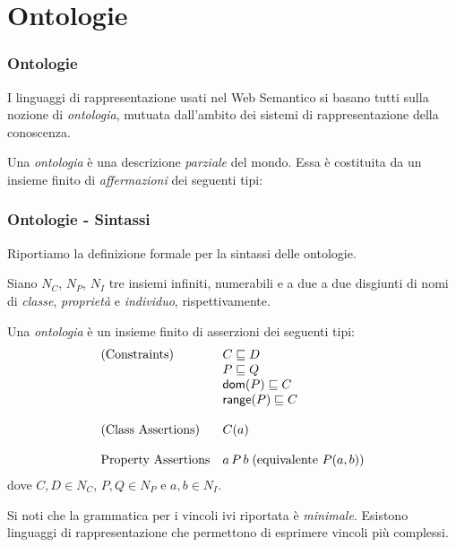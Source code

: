 \documentclass[8pt]{beamer}
\newcommand{\CNames}{N_C}
\newcommand{\PNames}{N_P}
\newcommand{\INames}{N_I}
\begin{document}
\section{Ontologie}

\begin{frame}
 \frametitle{Ontologie}
 
 I linguaggi di rappresentazione usati nel Web Semantico
 si basano tutti sulla nozione di \emph{ontologia}, mutuata
 dall'ambito dei sistemi di rappresentazione della conoscenza.
 \vspace{\baselineskip}

 Una \emph{ontologia} \`e una descrizione \emph{parziale} del mondo.
 Essa \`e costituita da un insieme finito di \emph{affermazioni}
 dei seguenti tipi:
 \vspace{\baselineskip}



\end{frame}

\begin{frame}
\frametitle{Ontologie - Sintassi}

Riportiamo la definizione formale per la sintassi delle ontologie.
\vspace{\baselineskip}

Siano $\CNames$, $\PNames$, $\INames$ tre insiemi infiniti, numerabili e 
a due a due disgiunti di nomi di \emph{classe}, \emph{propriet\`a} e \emph{individuo},
rispettivamente.
\vspace{\baselineskip}

Una \emph{ontologia} \`e un insieme finito di asserzioni dei seguenti tipi:
\[
 \begin{array}{ll}
  \mbox{(Constraints)} & C \sqsubseteq D\\
  & P \sqsubseteq Q \\
  & \mathsf{dom}(P) \sqsubseteq C \\
  & \mathsf{range}(P) \sqsubseteq C \\
  &\\
  \mbox{(Class Assertions)} & C(a)\\
  &\\
  \mbox{Property Assertions} & a\,P\,b\;(\mbox{equivalente }P(a,b))\\
 \end{array}
\]
dove $C, D \in \CNames$, $P, Q \in \PNames$ e $a, b \in \INames$.
\vspace{\baselineskip}

Si noti che la grammatica per i vincoli ivi riportata \`e \emph{minimale}.
Esistono linguaggi di rappresentazione che permettono di esprimere vincoli
pi\`u complessi.
\end{frame}
\end{document}
